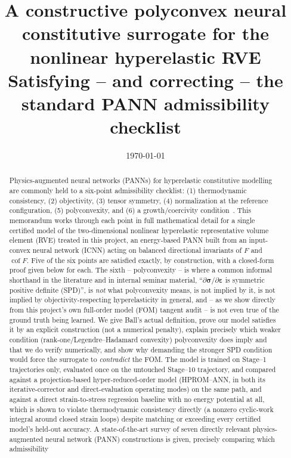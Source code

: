 \documentclass[10pt,a4paper]{article}
\title{A constructive polyconvex neural constitutive surrogate for the\\
nonlinear hyperelastic RVE\\
\large Satisfying -- and correcting -- the standard PANN admissibility checklist}
\author{}
\date{\today}
\newcommand{\Cof}{\operatorname{cof}}
\begin{document}
\maketitle

\begin{abstract}
Physics-augmented neural networks (PANNs) for hyperelastic constitutive
modelling are commonly held to a six-point admissibility checklist:
(1) thermodynamic consistency, (2) objectivity, (3) tensor symmetry,
(4) normalization at the reference configuration, (5) polyconvexity, and
(6) a growth/coercivity condition~\cite{Klein2022,Ball1977}.  This
memorandum works through each point in full mathematical detail for a
single certified model of the two-dimensional nonlinear hyperelastic
representative volume element (RVE) treated in this project, an
energy-based PANN built from an input-convex neural network (ICNN) acting
on balanced directional invariants of $F$ and $\Cof F$.  Five of the six
points are satisfied exactly, by construction, with a closed-form proof
given below for each.  The sixth -- polyconvexity -- is where a common
informal shorthand in the literature and in internal seminar material,
``$\partial\bm\sigma/\partial\bm\varepsilon$ is symmetric positive
definite (SPD)'', is \emph{not} what polyconvexity means, is not implied
by it, is not implied by objectivity-respecting hyperelasticity in
general, and -- as we show directly from this project's own full-order
model (FOM) tangent audit -- is not even true of the ground truth being
learned.  We give Ball's actual definition, prove our model satisfies it
by an explicit construction (not a numerical penalty), explain precisely
which weaker condition (rank-one/Legendre--Hadamard convexity) polyconvexity
does imply and that we do verify numerically, and show why demanding the
stronger SPD condition would force the surrogate to \emph{contradict} the
FOM.  The model is trained on Stage--1 trajectories only, evaluated once
on the untouched Stage--10 trajectory, and compared against a
projection-based hyper-reduced-order model (HPROM--ANN, in both its
iterative-corrector and direct-evaluation operating modes) on the same
path, and against a direct strain-to-stress regression baseline with no
energy potential at all, which is shown to violate thermodynamic
consistency directly (a nonzero cyclic-work integral around closed strain
loops) despite matching or exceeding every certified model's held-out
accuracy.  A state-of-the-art survey of
seven directly relevant physics-augmented neural network (PANN)
constructions is given, precisely comparing which admissibility

\end{abstract}
\end{document}
